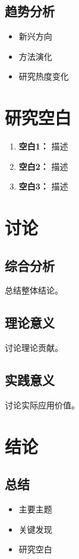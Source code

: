\documentclass[11pt,a4paper]{article}
\begin{document}
\subsection{趋势分析}
\begin{itemize}
    \item 新兴方向
    \item 方法演化
    \item 研究热度变化
\end{itemize}

\section{研究空白}
\label{sec:gaps}

\begin{enumerate}
    \item \textbf{空白1：} 描述
    \item \textbf{空白2：} 描述
    \item \textbf{空白3：} 描述
\end{enumerate}

\section{讨论}
\label{sec:discussion}

\subsection{综合分析}
总结整体结论。

\subsection{理论意义}
讨论理论贡献。

\subsection{实践意义}
讨论实际应用价值。

\section{结论}
\label{sec:conclusion}

\subsection{总结}
\begin{itemize}
    \item 主要主题
    \item 关键发现
    \item 研究空白
\end{itemize}
\end{document}
